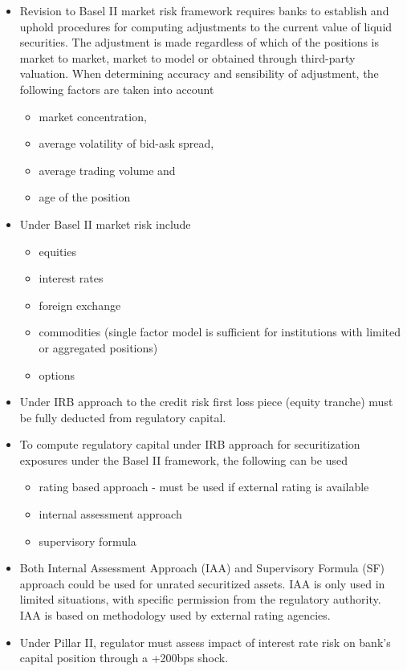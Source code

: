 \begin{itemize}
	\item Revision to Basel II market risk framework requires banks to establish and uphold procedures for computing adjustments to the current value of liquid securities. The adjustment is made regardless of which of the positions is market to market, market to model or obtained through third-party valuation. When determining accuracy and sensibility of adjustment, the following factors are taken into account
	\begin{itemize}
		\item market concentration,
		\item average volatility of bid-ask spread,
		\item average trading volume and
		\item age of the position
	\end{itemize}
	\item Under Basel II market risk include
	\begin{itemize}
		\item equities
		\item interest rates
		\item foreign exchange
		\item commodities (single factor model is sufficient for institutions with limited or aggregated positions)
		\item options
	\end{itemize}
	\item Under IRB approach to the credit risk first loss piece (equity tranche) must be fully deducted from regulatory capital.
	\item To compute regulatory capital under IRB approach for securitization exposures under the Basel II framework, the following can be used
	\begin{itemize}
		\item rating based approach - must be used if external rating is available
		\item internal assessment approach
		\item supervisory formula
	\end{itemize}
	\item Both Internal Assessment Approach (IAA) and Supervisory Formula (SF) approach could be used for unrated securitized assets. IAA is only used in limited situations, with specific permission from the regulatory authority. IAA is based on methodology used by external rating agencies.
	\item Under Pillar II, regulator must assess impact of interest rate risk on bank's capital position through a +200bps shock.

\end{itemize}
